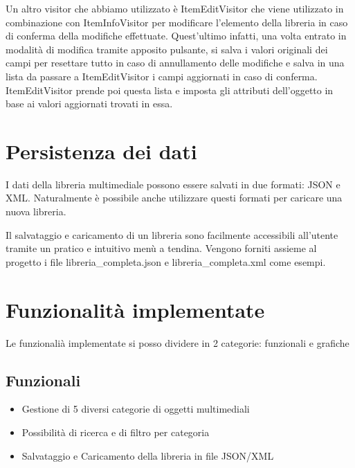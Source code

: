 \documentclass[a4paper,10pt]{article}
\begin{document}
Un altro visitor che abbiamo utilizzato è ItemEditVisitor che viene utilizzato in combinazione con ItemInfoVisitor per modificare l'elemento della libreria in caso di conferma della modifiche effettuate. Quest'ultimo infatti, una volta entrato in modalità di modifica tramite apposito pulsante, si salva i valori originali dei campi per resettare tutto in caso di annullamento delle modifiche e salva in una lista da passare a ItemEditVisitor i campi aggiornati in caso di conferma. ItemEditVisitor prende poi questa lista e imposta gli attributi dell'oggetto in base ai valori aggiornati trovati in essa.



\section{Persistenza dei dati}
I dati della libreria multimediale possono essere salvati in due formati: JSON e XML. 
Naturalmente è possibile anche utilizzare questi formati per caricare una nuova libreria.

Il salvataggio e caricamento di un libreria sono facilmente accessibili all'utente tramite un pratico e intuitivo menù a tendina.
Vengono forniti assieme al progetto i file libreria\_completa.json e libreria\_completa.xml come esempi.

\section{Funzionalità implementate}
Le funzionalià implementate si posso dividere in 2 categorie: funzionali e grafiche
\subsection*{Funzionali}
\begin{itemize}
    \item Gestione di 5 diversi categorie di oggetti multimediali
    \item Possibilità di ricerca e di filtro per categoria
    \item Salvataggio e Caricamento della libreria in file JSON/XML
\end{itemize}
\end{document}
